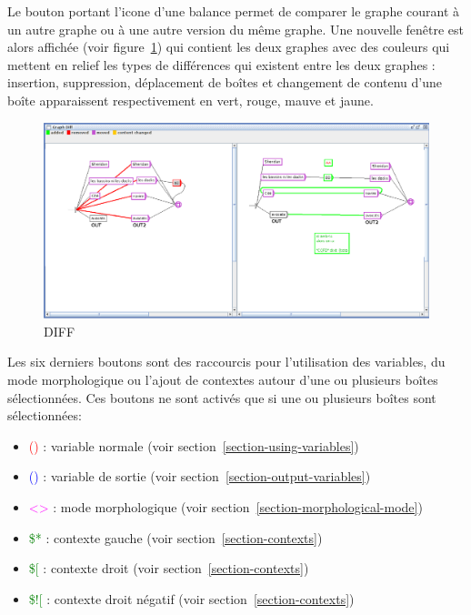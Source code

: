 \bigskip
\noindent Le bouton portant l'icone d'une balance permet de comparer le graphe courant à un autre
graphe ou à une autre version du même graphe. Une nouvelle fenêtre est alors affichée (voir
	figure~\ref{Graph-DIFF}) qui contient les deux graphes avec des couleurs qui mettent en
relief les types de différences qui existent entre les deux graphes : insertion, suppression,
déplacement de boîtes et changement de contenu d'une boîte apparaissent respectivement en vert,
rouge, mauve et jaune.

\bigskip
\noindent 
\begin{figure}[!h]
\begin{center}
\includegraphics[width=15.6cm]{resources/img/DIFF.png}
\caption{DIFF\label{Graph-DIFF}}
\end{center}
\end{figure}
\bigskip
\noindent

Les six derniers boutons sont des raccourcis pour l'utilisation des variables, du mode morphologique
ou l'ajout de contextes autour d'une ou plusieurs boîtes sélectionnées. Ces boutons ne sont activés que si une  ou plusieurs boîtes sont sélectionnées:
\begin{itemize}
\item \textcolor{red}{()}  : variable normale	(voir section~\ref{section-using-variables})
\item \textcolor{blue}{()} : variable de sortie (voir section~\ref{section-output-variables})
\item \textcolor{magenta}{<>} : mode morphologique (voir section~\ref{section-morphological-mode})
\item \textcolor{green}{\$*} : contexte gauche (voir section~\ref{section-contexts})
\item \textcolor{green}{\$[} : contexte droit (voir section~\ref{section-contexts})
\item \textcolor{green}{\$![} : contexte droit négatif (voir section~\ref{section-contexts})
\end{itemize}


